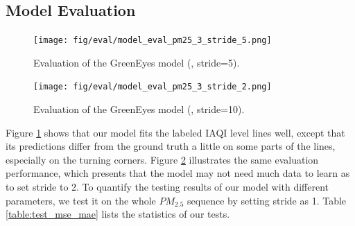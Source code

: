 \documentclass[sigconf]{acmart}
\begin{document}
\subsection{Model Evaluation}

\begin{figure}[!htbp]
    \centering
    \texttt{[image: fig/eval/model\_eval\_pm25\_3\_stride\_5.png]}
    \caption{Evaluation of the GreenEyes model (, stride=5).}
    \label{fig:model_eval_pm25_3_stride_5}
\end{figure}

\begin{figure}[!htbp]
    \centering
    \texttt{[image: fig/eval/model\_eval\_pm25\_3\_stride\_2.png]}
    \caption{Evaluation of the GreenEyes model (, stride=10).}
    \label{fig:model_eval_pm25_3_stride_2}
\end{figure}

Figure \ref{fig:model_eval_pm25_3_stride_5} shows that our model fits the labeled IAQI level lines well, except that its predictions differ from the ground truth a little on some parts of the lines, especially on the turning corners. Figure \ref{fig:model_eval_pm25_3_stride_2} illustrates the same evaluation performance, which presents that the model may not need much data to learn as to set stride to 2.
To quantify the testing results of our model with different parameters, we test it on the whole $PM_{2.5}$ sequence by setting stride as 1. Table \ref{table:test_mse_mae} lists the statistics of our tests.

\end{document}
